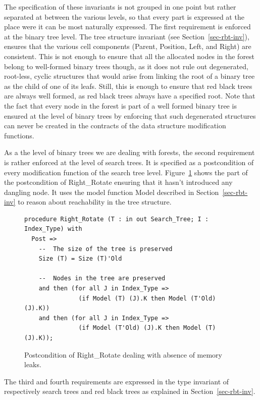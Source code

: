 \documentclass[11pt,a4paper]{article}
\begin{document}
The specification of these invariants is not grouped in one point but rather separated at between the various levels,
so that every part is expressed at the place were it can be most naturally expressed. The first requirement is
enforced at the binary tree level. The tree structure invariant (see Section~\ref{sec-rbt-inv}),
ensures that the various cell components (Parent, Position, Left, and Right) are consistent. This is not enough
to ensure that all the allocated nodes in the forest belong to well-formed binary trees though, as it does
not rule out degenerated, root-less, cyclic structures that would arise from linking the root of a binary tree as the
child of one of its leafs. Still, this is enough to ensure that red black trees are always well formed, as red black
trees always have a specified root. Note that the fact that every node in the forest is part of
a well formed binary tree is ensured at the level of binary trees by enforcing that such degenerated structures can
never be created in the contracts of the data structure modification functions.

As a the level of binary trees we are dealing with forests, the second requirement is rather enforced at the level of
search trees. It is specified as a postcondition of every modification function of the search tree level.
Figure~\ref{fig-spec-no-leak} shows the part of the postcondition of Right\_Rotate ensuring that it hasn't introduced
any dangling node. It uses the model function Model described in Section~\ref{sec-rbt-inv} to reason about reachability
in the tree structure.

\begin{figure}[ht]
\begin{small}
\begin{lstlisting}
procedure Right_Rotate (T : in out Search_Tree; I : Index_Type) with
  Post =>
    --  The size of the tree is preserved
    Size (T) = Size (T)'Old

    --  Nodes in the tree are preserved
    and then (for all J in Index_Type =>
               (if Model (T) (J).K then Model (T'Old) (J).K))
    and then (for all J in Index_Type =>
               (if Model (T'Old) (J).K then Model (T) (J).K));
\end{lstlisting}
\end{small}
\caption{\label{fig-spec-no-leak} Postcondition of Right\_Rotate dealing with absence of memory leaks.}
\end{figure}

The third and fourth requirements are expressed in the type invariant of respectively search trees and red black trees
as explained in Section~\ref{sec-rbt-inv}.
\end{document}
